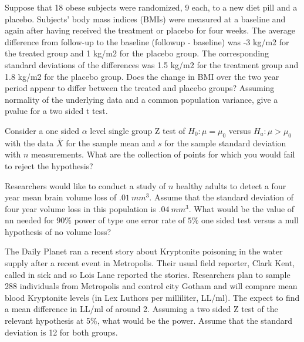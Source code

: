 \documentclass{homework}
\begin{document}
\begin{tcolorbox}[title=Question 6]
Suppose that 18 obese subjects were randomized, 9 each, to a new diet pill and a placebo. Subjects’ body mass indices (BMIs) were measured at a baseline and again after having received the treatment or placebo for four weeks. The average difference from follow-up to the baseline (followup - baseline) was -3 kg/m2 for the treated group and 1 kg/m2 for the placebo group. The corresponding standard deviations of the differences was 1.5 kg/m2 for the treatment group and 1.8 kg/m2 for the placebo group. Does the change in BMI over the two year period appear to differ between the treated and placebo groups?  Assuming normality of the underlying data and a common population variance, give a pvalue for a two sided t test.
\end{tcolorbox}

\begin{tcolorbox}[title=Question 7]
Consider a one sided $\alpha$ level single group Z test of $H_0 : \mu = \mu_0$ versus $H_a : \mu > \mu_0$   with the data $\bar X$ for the sample mean and $s$ for the sample standard deviation with $n$ measurements. What are the collection of points for which you would fail to reject the hypothesis?
\end{tcolorbox}

\begin{tcolorbox}[title=Question 8]
Researchers would like to conduct a study of $n$ healthy adults to detect a four year mean brain volume loss of  $.01~mm^3$. Assume that the standard deviation of four year volume loss in this population is $.04~mm^3$. What would be the value of nn needed for $90\%$ power of type one error rate of $5\%$ one sided test versus a null hypothesis of no volume loss?
\end{tcolorbox}

\begin{tcolorbox}[title=Question 9]
The Daily Planet ran a recent story about Kryptonite poisoning in the water supply after a recent event in Metropolis. Their usual field reporter, Clark Kent, called in sick and so Lois Lane reported the stories. Researchers plan to sample 288 individuals from Metropolis and control city Gotham and will compare mean blood Kryptonite levels (in Lex Luthors per milliliter, LL/ml). The expect to find a mean difference in LL/ml of around 2. Assuming a two sided Z test of the relevant hypothesis at 5\%, what would be the power. Assume that the standard deviation is 12 for both groups.
\end{tcolorbox}
\end{document}
